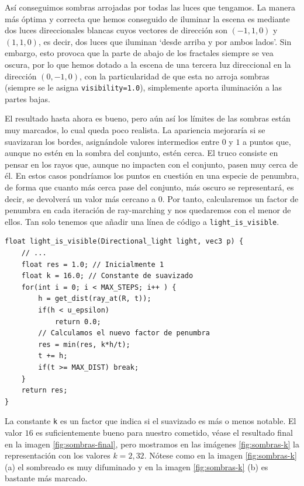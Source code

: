 Así conseguimos sombras arrojadas por todas las luces que tengamos. La manera más óptima y correcta que hemos conseguido de iluminar la escena es mediante dos luces direccionales blancas cuyos vectores de dirección son $(-1,1,0)$ y $(1,1,0)$, es decir, dos luces que iluminan `desde arriba y por ambos lados'. Sin embargo, esto provoca que la parte de abajo de los fractales siempre se vea oscura, por lo que hemos dotado a la escena de una tercera luz direccional en la dirección $(0,-1,0)$, con la particularidad de que esta no arroja sombras (siempre se le asigna \verb|visibility=1.0|), simplemente aporta iluminación a las partes bajas.

El resultado hasta ahora es bueno, pero aún así los límites de las sombras están muy marcados, lo cual queda poco realista. La apariencia mejoraría si se suavizaran los bordes, asignándole valores intermedios entre $0$ y $1$ a puntos que, aunque no estén en la sombra del conjunto, estén cerca. El truco consiste en pensar en los rayos que, aunque no impacten con el conjunto, pasen muy cerca de él. En estos casos pondríamos los puntos en cuestión en una especie de penumbra, de forma que cuanto más cerca pase del conjunto, más oscuro se representará, es decir, se devolverá un valor más cercano a $0$. Por tanto, calcularemos un factor de penumbra en cada iteración de ray-marching y nos quedaremos con el menor de ellos. Tan solo tenemos que añadir una línea de código a \verb|light_is_visible|.

\begin{lstlisting}
float light_is_visible(Directional_light light, vec3 p) {
    // ... 
    float res = 1.0; // Inicialmente 1
    float k = 16.0; // Constante de suavizado
    for(int i = 0; i < MAX_STEPS; i++ ) {
        h = get_dist(ray_at(R, t));
        if(h < u_epsilon)
            return 0.0;
        // Calculamos el nuevo factor de penumbra
        res = min(res, k*h/t); 
        t += h;
        if(t >= MAX_DIST) break;
    }
    return res;
}
\end{lstlisting}

La constante \verb|k| es un factor que indica si el suavizado es más o menos notable. El valor $16$ es suficientemente bueno para nuestro cometido, véase el resultado final en la imagen \ref{fig:sombras-final}, pero mostramos en las imágenes \ref{fig:sombras-k} la representación con los valores $k=2,32$. Nótese como en la imagen \ref{fig:sombras-k} (a) el sombreado es muy difuminado y en la imagen \ref{fig:sombras-k} (b) es bastante más marcado.

